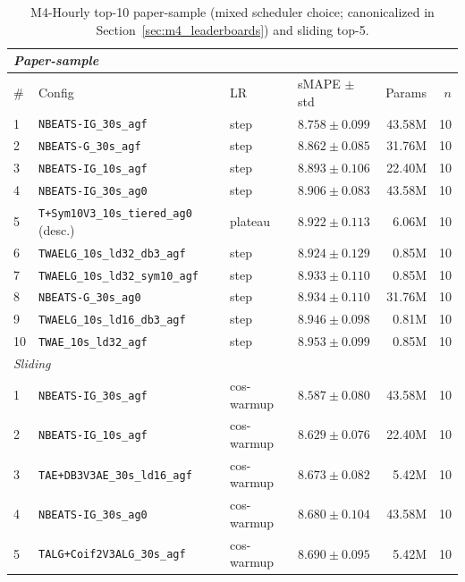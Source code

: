 \documentclass{article}
\begin{document}
\begin{table}[h]
\centering
\scriptsize
\setlength{\tabcolsep}{2.5pt}
\caption{M4-Hourly top-10 paper-sample (mixed scheduler choice; canonicalized in Section~\ref{sec:m4_leaderboards}) and sliding top-5.}
\label{tab:m4_hourly_full}
\begin{tabular}{@{}llllrr@{}}
\toprule
\multicolumn{6}{l}{\textit{Paper-sample}} \\
\midrule
\# & Config & LR & sMAPE $\pm$ std & Params & $n$ \\
\midrule
1  & \texttt{NBEATS-IG\_30s\_agf}                  & step    & $\mathbf{8.758 \pm 0.099}$ & 43.58M & 10 \\
2  & \texttt{NBEATS-G\_30s\_agf}                   & step    & $8.862 \pm 0.085$          & 31.76M & 10 \\
3  & \texttt{NBEATS-IG\_10s\_agf}                  & step    & $8.893 \pm 0.106$          & 22.40M & 10 \\
4  & \texttt{NBEATS-IG\_30s\_ag0}                  & step    & $8.906 \pm 0.083$          & 43.58M & 10 \\
5  & \texttt{T+Sym10V3\_10s\_tiered\_ag0} (desc.)  & plateau & $8.922 \pm 0.113$          & 6.06M  & 10 \\
6  & \texttt{TWAELG\_10s\_ld32\_db3\_agf}          & step    & $8.924 \pm 0.129$          & 0.85M  & 10 \\
7  & \texttt{TWAELG\_10s\_ld32\_sym10\_agf}        & step    & $8.933 \pm 0.110$          & 0.85M  & 10 \\
8  & \texttt{NBEATS-G\_30s\_ag0}                   & step    & $8.934 \pm 0.110$          & 31.76M & 10 \\
9  & \texttt{TWAELG\_10s\_ld16\_db3\_agf}          & step    & $8.946 \pm 0.098$          & 0.81M  & 10 \\
10 & \texttt{TWAE\_10s\_ld32\_agf}                 & step    & $8.953 \pm 0.099$          & 0.85M  & 10 \\
\midrule
\multicolumn{6}{l}{\textit{Sliding}} \\
\midrule
1  & \texttt{NBEATS-IG\_30s\_agf}                  & cos-warmup & $\mathbf{8.587 \pm 0.080}$ & 43.58M & 10 \\
2  & \texttt{NBEATS-IG\_10s\_agf}                  & cos-warmup & $8.629 \pm 0.076$          & 22.40M & 10 \\
3  & \texttt{TAE+DB3V3AE\_30s\_ld16\_agf}          & cos-warmup & $8.673 \pm 0.082$          & 5.42M  & 10 \\
4  & \texttt{NBEATS-IG\_30s\_ag0}                  & cos-warmup & $8.680 \pm 0.104$          & 43.58M & 10 \\
5  & \texttt{TALG+Coif2V3ALG\_30s\_agf}            & cos-warmup & $8.690 \pm 0.095$          & 5.42M  & 10 \\
\bottomrule
\end{tabular}
\end{table}
\end{document}
